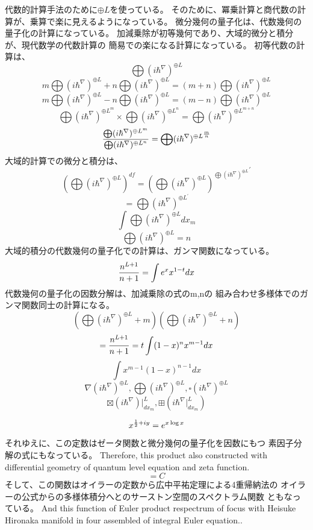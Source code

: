\documentclass{jsarticle}
\begin{document}
         代数的計算手法のために$ \oplus L $を使っている。
そのために、冪乗計算と商代数の計算が、乗算で楽に見えるようになっている。
            微分幾何の量子化は、代数幾何の量子化の計算になっている。
  加減乗除が初等幾何であり、大域的微分と積分が、現代数学の代数計算の
  簡易での楽になる計算になっている。
  初等代数の計算は、
  $$ \bigoplus({i \hbar^{\nabla}})^{\oplus L} $$
   $$m \bigoplus({i \hbar^{\nabla}})^{\oplus L} +  
   n\bigoplus({i \hbar^{\nabla}})^{\oplus L} = 
   (m+n) \bigoplus({i \hbar^{\nabla}})^{\oplus L}   $$
   $$ m\bigoplus({i \hbar^{\nabla}})^{\oplus L} -  
   n\bigoplus({i \hbar^{\nabla}})^{\oplus L} = 
   (m-n) \bigoplus({i \hbar^{\nabla}})^{\oplus L}   $$
   $$ \bigoplus({i \hbar^{\nabla}})^{{\oplus L}^m} \times 
      \bigoplus({i \hbar^{\nabla}})^{{\oplus L}^n} =
   \bigoplus({i \hbar^{\nabla}})^{\oplus L^{m+n}} $$
  $$ {{\bigoplus({i \hbar^{\nabla}})^{\oplus L^m}}  \over  
  {\bigoplus({i \hbar^{\nabla}})^{\oplus L^n}}} =  
  \bigoplus({i \hbar^{\nabla}})^{\oplus L^{m\over n}} $$
  大域的計算での微分と積分は、
  $$ \left(\bigoplus({i \hbar^{\nabla}})^{\oplus L}\right)^{df}
  =  {\left(\bigoplus({i \hbar^{\nabla}})^{\oplus L}\right)^{
	  \bigoplus({i \hbar^{\nabla}})^{\oplus L}}}^{'}  $$
  $$ = \bigoplus({i \hbar^{\nabla}})^{\oplus L^{'}} $$
   $$ \int \bigoplus({i \hbar^{\nabla}})^{\oplus L} dx_m $$
   $$ \bigoplus({i \hbar^{\nabla}})^{\oplus L} = n $$
   大域的積分の代数幾何の量子化での計算は、ガンマ関数になっている。
   $$ {n^{L+1} \over {n+1}} = \int e^x x^{1 - t} dx $$
   代数幾何の量子化の因数分解は、加減乗除の式のm,nの
   組み合わせ多様体でのガンマ関数同士の計算になる。
   $$ \left(\bigoplus({i \hbar^{\nabla}})^{\oplus L}+m\right) 
   \left(\bigoplus({i \hbar^{\nabla}})^{\oplus L}+n\right) $$
  $$ = {n^{L+1} \over {n+1}} = t \int (1 - x)^n x^{m - 1} dx $$
  $$ \int x^{m-1}(1 - x)^{n-1} dx $$
  $$ \nabla ({i \hbar^{\nabla}})^{\oplus L}, \bigoplus ({i \hbar^{\nabla}})^{
	   \oplus L}, \square ({i \hbar^{\nabla}})^{\oplus L} $$
   $$ \boxtimes (i \hbar^{\nabla})|_{dx_m}^L, \boxplus (i \hbar^{\nabla}|_
   {dx_m}^L) $$



  $$ x^{{1 \over 2} + iy} = e^{x \log x} $$
  それゆえに、この定数はゼータ関数と微分幾何の量子化を因数にもつ
  素因子分解の式にもなっている。
  Therefore, this product also constructed with differential geometry
  of quantum level equation and zeta function.
  $$ = C $$ 
  そして、この関数はオイラーの定数から広中平祐定理による4重帰納法の
  オイラーの公式からの多様体積分へとのサーストン空間のスペクトラム関数
  ともなっている。
  And this function of Euler product respectrum of focus with
  Heisuke Hironaka manifold in four assembled of integral Euler equation.. 
\end{document}

